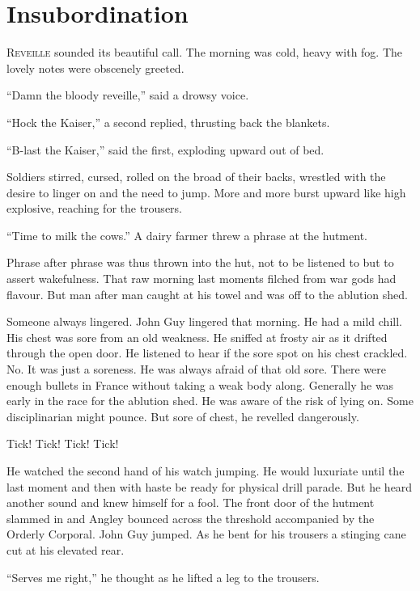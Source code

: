 \chapter*{\textsf{Insubordination}}

R\textsc{eveille} sounded its beautiful call. The morning was cold, heavy with fog. 
The lovely notes were obscenely greeted.

``Damn the bloody reveille,'' said a drowsy voice.

``Hock the Kaiser,'' a second replied, thrusting back the blankets.

``B-last the Kaiser,'' said the first, exploding upward out of bed.

Soldiers stirred, cursed, rolled on the broad of their backs, wrestled with the 
desire to linger on and the need to jump. More and more burst upward like 
high explosive, reaching for the trousers.

``Time to milk the cows.'' A dairy farmer threw a phrase at the hutment.

Phrase after phrase was thus thrown into the hut, not to be listened to 
but to assert wakefulness. That raw morning last moments filched from 
war gods had flavour. But man after man caught at his towel and was off 
to the ablution shed.

Someone always lingered. John Guy lingered that morning. He had a mild 
chill. His chest was sore from an old weakness. He sniffed at frosty air 
as it drifted through the open door. He listened to hear if the sore spot 
on his chest crackled. No. It was just a soreness. He was always afraid 
of that old sore. There were enough bullets in France without taking 
a weak body along. Generally he was early in the race for the ablution 
shed. He was aware of the risk of lying on. Some disciplinarian might 
pounce. But sore of chest, he revelled dangerously.

Tick! Tick! Tick! Tick!

He watched the second hand of his watch jumping. He would luxuriate until 
the last moment and then with haste be ready for physical drill parade. 
But he heard another sound and knew himself for a fool. The front door 
of the hutment slammed in and Angley bounced across the threshold 
accompanied by the Orderly Corporal. John Guy jumped. As he bent for his 
trousers a stinging cane cut at his elevated rear.

``Serves me right,'' he thought as he lifted a leg to the trousers.

